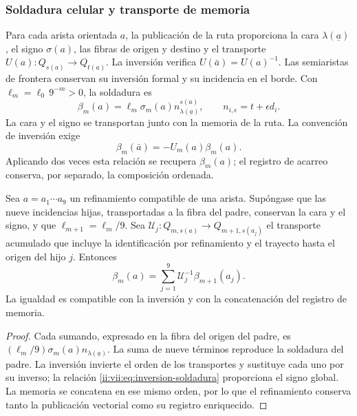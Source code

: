 \subsubsection{Soldadura celular y transporte de memoria}
\label{ii:vii:sec:soldadura-celular}

Para cada arista orientada \(a\), la publicación de la ruta proporciona
la cara \(\lambda(\underline a)\), el signo
\(\sigma(a)\), las fibras de origen y destino y el transporte
\(U(a):Q_{s(a)}\longrightarrow Q_{t(a)}\).
La inversión verifica \(U(\bar a)=U(a)^{-1}\).
Las semiaristas de frontera conservan su inversión formal y su incidencia
en el borde. Con \(\ell_m=\ell_0\,9^{-m}>0\), la soldadura es
\begin{equation}
 \beta_m(a)=\ell_m\sigma_m(a)
              n_{\lambda(\underline a)}^{s(a)},\qquad
 n_{i,\epsilon}=t+\epsilon d_i.
 \label{ii:vii:eq:soldadura-arista}
\end{equation}
La cara y el signo se transportan junto con la memoria de la ruta.
La convención de inversión exige
\begin{equation}
 \beta_m(\bar a)=-U_m(a)\beta_m(a).
 \label{ii:vii:eq:inversion-soldadura}
\end{equation}
Aplicando dos veces esta relación se recupera \(\beta_m(a)\);
el registro de acarreo conserva, por separado, la composición ordenada.

\begin{proposition}
\label{ii:vii:prop:refinamiento-soldadura}
Sea \(a=a_1\cdots a_9\) un refinamiento compatible de una arista.
Supóngase que las nueve incidencias hijas, transportadas a la fibra del
padre, conservan la cara y el signo, y que
\(\ell_{m+1}=\ell_m/9\). Sea
\(\mathcal U_j:Q_{m,s(a)}\longrightarrow Q_{m+1,s(a_j)}\)
el transporte acumulado que incluye la identificación por refinamiento
y el trayecto hasta el origen del hijo \(j\). Entonces
\[
 \beta_m(a)=
 \sum_{j=1}^{9}\mathcal U_j^{-1}\beta_{m+1}(a_j).
\]
La igualdad es compatible con la inversión y con la concatenación
del registro de memoria.
\end{proposition}

\begin{proof}
Cada sumando, expresado en la fibra del origen del padre, es
\((\ell_m/9)\sigma_m(a)n_{\lambda(\underline a)}\).
La suma de nueve términos reproduce la soldadura del padre.
La inversión invierte el orden de los transportes y sustituye cada uno
por su inverso; la relación \eqref{ii:vii:eq:inversion-soldadura} proporciona
el signo global. La memoria se concatena en ese mismo orden, por lo
que el refinamiento conserva tanto la publicación vectorial como su
registro enriquecido.
\end{proof}

